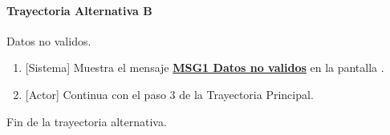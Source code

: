 \paragraph{Trayectoria Alternativa B} \label{W-PR-CU1.1.1:TB}
	Datos no validos.
	\begin{enumerate}[label=B\arabic*.]
		\item {[Sistema]} Muestra el mensaje \hyperref[MSG1]{\bf MSG1 Datos no validos} en la pantalla \textbf{}.
		\item {[Actor]} Continua con el paso 3 de la Trayectoria Principal.
	\end{enumerate}
	Fin de la trayectoria alternativa.